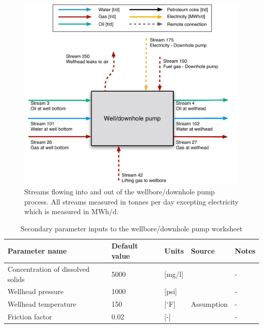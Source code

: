 \documentclass[11pt]{report}
\begin{document}
\begin{figure}
\includegraphics[width=0.85\columnwidth]{images/Wellbore_downhole_pump_PF.pdf}
\caption{Streams flowing into and out of the wellbore/downhole pump process. All streams measured in tonnes per day excepting electricity which is measured in MWh/d.}
\label{fig:wellbore_PF}
\end{figure}


\begin{table}
\caption{Secondary parameter inputs to the wellbore/downhole pump worksheet}
\label{tab:wellbore_SI}
\begin{scriptsize}
\begin{tabularx}{1\columnwidth}{p{}p{}p{}p{}p{}}
\toprule
Parameter name						& Default value   		& Units 	& Source			      			& Notes 		\\ 
\midrule
Concentration of dissolved solids 			& 5000				& [mg/l]	& \cite{Vlasopoulous2006}			& -			\\
Wellhead pressure						& 1000				& [psi] 	& \cite{Manning1991}			& -			\\
Wellhead temperature					& 150				& [$^\circ$F]	& Assumption				& -			\\
Friction factor							& 0.02				& [-]		& \cite{Lake?}					& -			\\
\bottomrule
\end{tabularx}
\end{scriptsize}
\end{table}

\clearpage
\end{document}
